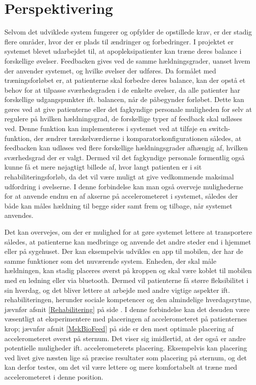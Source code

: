 \section{Perspektivering}
Selvom det udviklede system fungerer og opfylder de opstillede krav, er der stadig flere områder, hvor der er plads til ændringer og forbedringer. 
I projektet er systemet blevet udarbejdet til, at apopleksipatienter kan træne deres balance i forskellige øvelser. Feedbacken gives ved de samme hældningsgrader, uanset hvem der anvender systemet, og hvilke øvelser der udføres. Da formålet med træningsforløbet er, at patienterne skal forbedre deres balance, kan der opstå et behov for at tilpasse sværhedsgraden i de enkelte øvelser, da alle patienter har forskellige udgangspunkter ift. balancen, når de påbegynder forløbet. Dette kan gøres ved at give patienterne eller det fagkyndige personale muligheden for selv at regulere på hvilken hældningsgrad, de forskellige typer af feedback skal udløses ved. Denne funktion kan implementeres i systemet ved at tilføje en switch-funktion, der ændrer tærskelværdierne i komparatorkonfigurationen således, at feedbacken kan udløses ved flere forskellige hældningsgrader afhængig af, hvilken sværhedsgrad der er valgt. Dermed vil det fagkyndige personale formentlig også kunne få et mere nøjagtigt billede af, hvor langt patienten er i sit rehabiliteringsforløb, da det vil være muligt at give vedkommende maksimal udfordring i øvelserne. I denne forbindelse kan man også overveje mulighederne for at anvende endnu en af akserne på accelerometeret i systemet, således der både kan måles hældning til begge sider samt frem og tilbage, når systemet anvendes.

Det kan overvejes, om der er mulighed for at gøre systemet lettere at transportere således, at patienterne kan medbringe og anvende det andre steder end i hjemmet eller på sygehuset. Der kan eksempelvis udvikles en app til mobilen, der har de samme funktioner som det nuværende system. Enheden, der skal måle hældningen, kan stadig placeres øverst på kroppen og skal være koblet til mobilen med en ledning eller via bluetooth. Dermed vil patienterne få større fleksibilitet i sin hverdag, og det bliver lettere at arbejde med andre vigtige aspekter ift. rehabiliteringen, herunder sociale kompetencer og den almindelige hverdagsrytme, jævnfør afsnit \ref{Rehabilitering} på side \pageref{Rehabilitering}. I denne forbindelse kan det desuden være væsentligt at eksperimentere med placeringen af accelerometeret på patienternes krop; jævnfør afsnit \ref{MekBioFeed} på side \pageref{MekBioFeed} er den mest optimale placering af accelerometeret øverst på sternum. Det viser sig imidlertid, at der også er andre potentielle muligheder ift. accelerometerets placering. Eksempelvis kan placering ved livet give næsten lige så præcise resultater som placering på sternum, og det kan derfor testes, om det vil være lettere og mere komfortabelt at træne med accelerometeret i denne position\cite{Gjoreski2011}.

